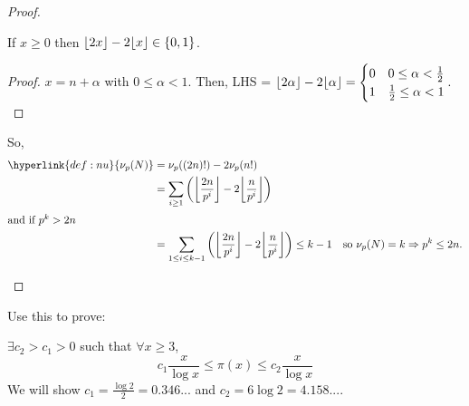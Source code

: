 \documentclass{article}
\DeclarePairedDelimiter\floor{\lfloor}{\rfloor}
\begin{document}
\begin{proof}
\begin{enumerate}[label=(\roman*)]
            \begin{lemma}
                If $x \geq 0$ then $\floor{2x} - 2 \floor{x} \in \{0, 1\}$.
            \end{lemma}
            \begin{proof}
                $x = n + \alpha$ with $0 \leq \alpha < 1$.
                Then, LHS = $\floor{2\alpha} - 2 \floor{\alpha} = \begin{cases}0 & 0 \leq \alpha < \frac{1}{2} \\ 1 & \frac{1}{2} \leq \alpha < 1\end{cases}.$
            \end{proof}
            So,
            \begin{align*}
                \hyperlink{def:nu}{\nu_p(N)} &= \nu_p((2n)!) - 2 \nu_p(n!) \\
                         &= \sum_{i \geq 1} \left(\floor*{\frac{2n}{p^i}} - 2 \floor*{\frac{n}{p^i}}\right) \\
                \shortintertext{and if $p^k > 2n$}
                &= \sum_{1 \leq i \leq k-1} \left(\floor*{\frac{2n}{p^i}} - 2 \floor*{\frac{n}{p^i}}\right) \leq k-1 \quad \text{so } \nu_p(N) = k \Rightarrow p^k \leq 2n. \qedhere
            \end{align*}
    \end{enumerate}
\end{proof}

Use this to prove:
\begin{nthm}\label{thm:5.8}
    $\exists c_2 > c_1 > 0$ such that $\forall x \geq 3$,
    \begin{equation*}c_1 \frac{x}{\log x} \leq \pi(x) \leq c_2 \frac{x}{\log x}\end{equation*}
    We will show $c_1 = \frac{\log 2}{2} = 0.346...$ and $c_2 = 6 \log 2 = 4.158...$.
\end{nthm}
\end{document}
